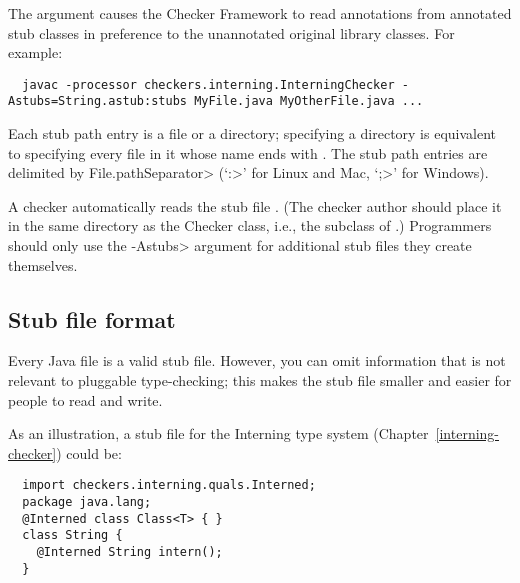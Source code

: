 The  argument causes the Checker Framework to read
annotations from annotated stub classes in preference to the unannotated
original library classes.  For example:

\begin{smaller}
\begin{Verbatim}
  javac -processor checkers.interning.InterningChecker -Astubs=String.astub:stubs MyFile.java MyOtherFile.java ...
\end{Verbatim}
\end{smaller}

Each stub path entry is a file or a directory; specifying a directory is
equivalent to specifying every file in it whose name ends with
.  The stub path entries are delimited by
\<File.pathSeparator> (`\<:>' for Linux and Mac, `\<;>' for Windows).

A checker automatically reads the stub file .  (The checker
author should place it in the same directory as the Checker class, i.e.,
the subclass of .)  Programmers should only use the
\<-Astubs> argument for additional stub files they create themselves.






\subsection{Stub file format\label{stub-format}}

Every Java file is a valid stub file.  However, you can omit information
that is not relevant to pluggable type-checking; this makes the stub file
smaller and easier for people to read and write.

As an illustration, a stub file for the Interning type system
(Chapter~\ref{interning-checker}) could be:

\begin{Verbatim}
  import checkers.interning.quals.Interned;
  package java.lang;
  @Interned class Class<T> { }
  class String {
    @Interned String intern();
  }
\end{Verbatim}





